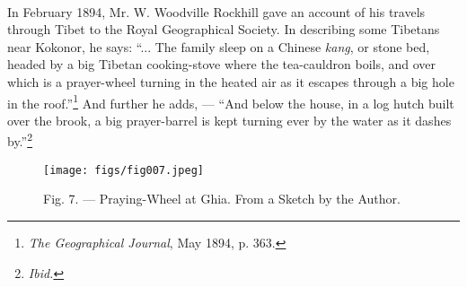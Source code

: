 \documentclass[a4paper, 11pt, oneside, polutonikogreek, english]{article}
\begin{document}
\paragraph{}
In February 1894, Mr. W. Woodville Rockhill gave an account of his travels through Tibet to the Royal Geographical Society. In describing some Tibetans near Kokonor, he says: ``... The family sleep on a Chinese \emph{kang}, or stone bed, headed by a big Tibetan cooking-stove where the tea-cauldron boils, and over which is a prayer-wheel turning in the heated air as it escapes through a big hole in the roof.''\footnote{\emph{The Geographical Journal}, May 1894, p. 363.} And further he adds, --- ``And below the house, in a log hutch built over the brook, a big prayer-barrel is kept turning ever by the water as it dashes by.''\footnote{\emph{Ibid.}}

\begin{figure}[H]
\centering
\texttt{[image: figs/fig007.jpeg]}
\caption[Fig. 7. --- Praying-Wheel at Ghia.]{Fig. 7. --- Praying-Wheel at Ghia. From a Sketch by the Author.}
\end{figure}
\end{document}

